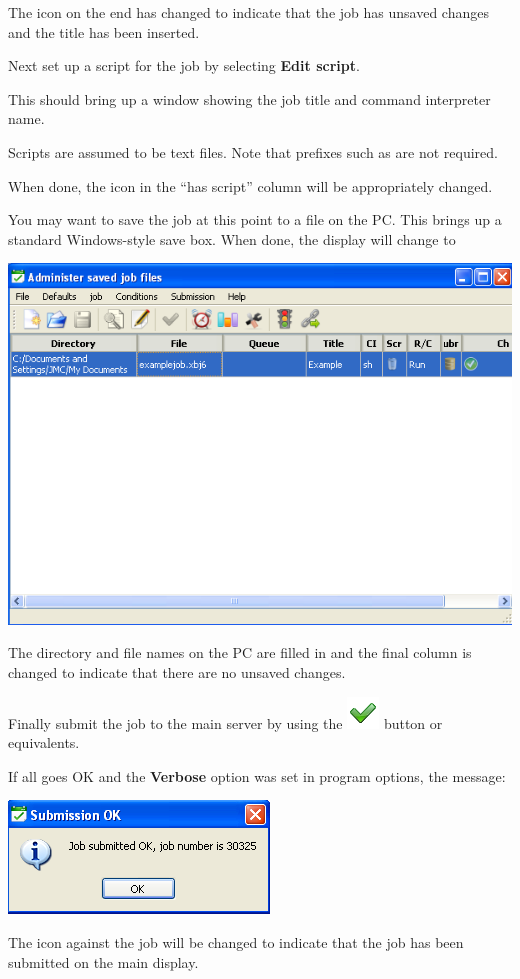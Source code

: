 The icon on the end has changed to indicate that the job has unsaved changes and the title
has been inserted.

Next set up a script for the job by selecting \textbf{Edit script}.

This should bring up a window showing the job title and command interpreter name.

Scripts are assumed to be text files. Note that prefixes such as  are not required.

When done, the icon in the ``has script'' column will be appropriately changed.

You may want to save the job at this point to a file on the PC. This brings up a standard
Windows-style save box. When done, the display will change to

\includegraphics{img/btrwnewjob4.png}

The directory and file names on the PC are filled in and the final column is changed to indicate that there are no unsaved changes.

Finally submit the job to the main server by using the \includegraphics{img/btrwjobsubmit.png} button or equivalents.

If all goes OK and the \textbf{Verbose} option was set in program options, the message:

\includegraphics{img/btrwnewjob5.png}

The icon against the job will be changed to indicate that the job has been submitted on the main display.


